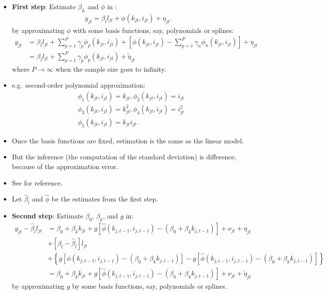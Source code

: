 \documentclass[
]{book}
\providecommand{\tightlist}{%
  \setlength{\itemsep}{0pt}\setlength{\parskip}{0pt}}
\begin{document}
\begin{itemize}
\tightlist
\item
  \textbf{First step}: Estimate \(\beta_L\) and \(\phi\) in :
  \begin{equation}
  \begin{split}
  y_{jt} = \beta_l l_{jt} + \phi(k_{jt}, i_{jt}) + \eta_{jt}.
  \end{split}
  \end{equation}
  by approximating \(\phi\) with some basis functions, say, polynomials or splines:
  \begin{equation}
  \begin{split}
  y_{jt} &= \beta_l l_{jt} +  \sum_{p = 1}^P \gamma_p \phi_p(k_{jt}, i_{jt}) +  \left[\phi(k_{jt}, i_{jt}) - \sum_{p = 1}^P \gamma_n \phi_n(k_{jt}, i_{jt})\right] + \eta_{jt}\\
  & = \beta_l l_{jt} +  \sum_{p = 1}^P \gamma_p \phi_p(k_{jt}, i_{jt}) + \tilde{\eta}_{jt}
  \end{split}
  \end{equation}
  where \(P \to \infty\) when the sample size goes to infinity.
\item
  e.g.~second-order polynomial approximation:
  \begin{equation}
  \begin{split}
  & \phi_1(k_{jt}, i_{jt}) = k_{jt}, \phi_2(k_{jt}, i_{jt}) = i_{jt}\\
  & \phi_3(k_{jt}, i_{jt}) = k_{jt}^2, \phi_4(k_{jt}, i_{jt}) = i_{jt}^2\\
  & \phi_5(k_{jt}, i_{jt}) = k_{jt} i_{jt}.
  \end{split}
  \end{equation}
\item
  Once the basis functions are fixed, estimation is the same as the linear model.
\item
  But the inference (the computation of the standard deviation) is difference, because of the approximation error.
\item
  See \citet{Chen2007} for reference.
\item
  Let \(\hat{\beta}_l\) and \(\hat{\phi}\) be the estimates from the first step.
\item
  \textbf{Second step}: Estimate \(\beta_0\), \(\beta_k\), and \(g\) in:
  \begin{equation}
  \begin{split}
  y_{jt} - \hat{\beta}_l l_{jt}& = \beta_0 + \beta_k k_{jt} + g[\hat{\phi}(k_{j, t - 1}, i_{j, t - 1}) - (\beta_0 + \beta_k k_{j, t - 1})] + \nu_{jt} + \eta_{jt}\\
  &+ [\beta_l - \hat{\beta}_l] l_{jt}\\
  &+ \left\{g[\phi(k_{j, t - 1}, i_{j, t - 1}) - (\beta_0 + \beta_k k_{j, t - 1})] - g[\hat{\phi}(k_{j, t - 1}, i_{j, t - 1}) - (\beta_0 + \beta_k k_{j, t - 1})]\right\}\\
  & = \beta_0 + \beta_k k_{jt} + g[\hat{\phi}(k_{j, t - 1}, i_{j, t - 1}) - (\beta_0 + \beta_k k_{j, t - 1})] + \nu_{jt} + \tilde{\eta}_{jt}
  \end{split}
  \end{equation}
  by approximating \(g\) by some basis functions, say, polynomials or splines.
\end{itemize}
\end{document}
